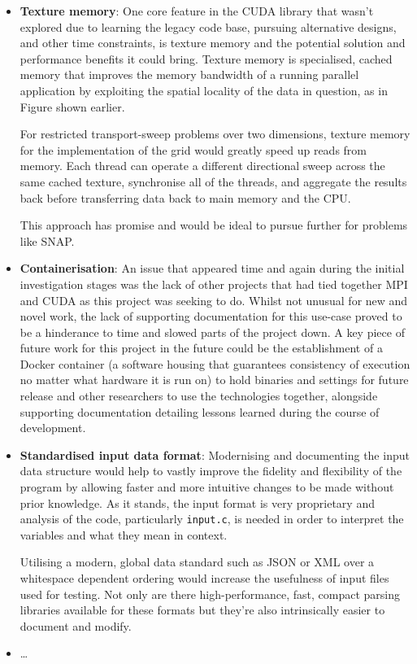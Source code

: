 \documentclass[conference]{IEEEtran}
\begin{document}
\begin{itemize}
    \item \textbf{Texture memory}: One core feature in the CUDA library that wasn't explored due to learning the legacy code base, pursuing alternative designs, and other time constraints, is texture memory and the potential solution and performance benefits it could bring. Texture memory is specialised, cached memory that improves the memory bandwidth of a running parallel application by exploiting the spatial locality of the data in question, as in Figure \label{fig:texmem} shown earlier.
    
        
    
    For restricted transport-sweep problems over two dimensions, texture memory for the implementation of the grid would greatly speed up reads from memory. Each thread can operate a different directional sweep across the same cached texture, synchronise all of the threads, and aggregate the results back before transferring data back to main memory and the CPU. 

    This approach has promise and would be ideal to pursue further for problems like SNAP.

    \item \textbf{Containerisation}: An issue that appeared time and again during the initial investigation stages was the lack of other projects that had tied together MPI and CUDA as this project was seeking to do. Whilst not unusual for new and novel work, the lack of supporting documentation for this use-case proved to be a hinderance to time and slowed parts of the project down. A key piece of future work for this project in the future could be the establishment of a Docker container (a software housing that guarantees consistency of execution no matter what hardware it is run on) to hold binaries and settings for future release and other researchers to use the technologies together, alongside supporting documentation detailing lessons learned during the course of development.

    \item \textbf{Standardised input data format}: Modernising and documenting the input data structure would help to vastly improve the fidelity and flexibility of the program by allowing faster and more intuitive changes to be made without prior knowledge. As it stands, the input format is very proprietary and analysis of the code, particularly \texttt{input.c}, is needed in order to interpret the variables and what they mean in context.
    
    Utilising a modern, global data standard such as JSON or XML over a whitespace dependent ordering would increase the usefulness of input files used for testing. Not only are there high-performance, fast, compact parsing libraries available for these formats but they're also intrinsically easier to document and modify.

    \item \dots

\end{itemize}




\end{document}
